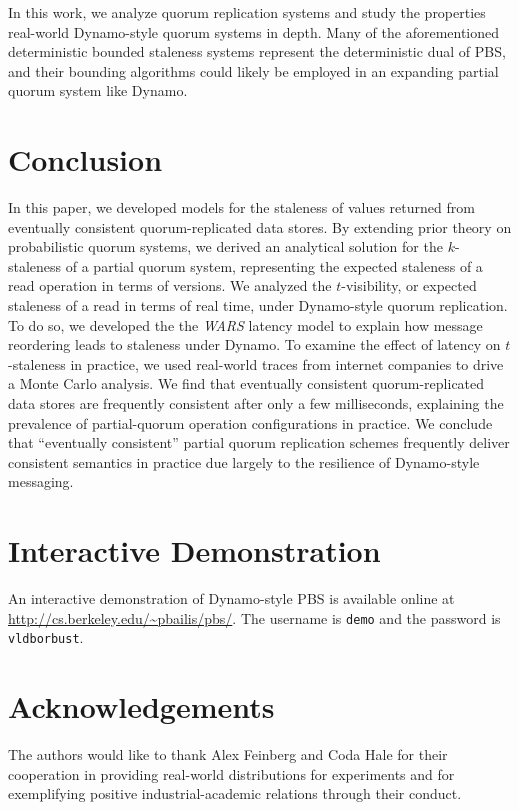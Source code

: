 \documentclass{vldb}
\begin{document}
In this work, we analyze quorum replication systems and study the
properties real-world Dynamo-style quorum systems in depth.  Many of
the aforementioned deterministic bounded staleness systems represent the
deterministic dual of PBS, and their bounding algorithms could likely
be employed in an expanding partial quorum system like Dynamo.

\section{Conclusion}
\label{sec:conclusion}

In this paper, we developed models for the staleness of values
returned from eventually consistent quorum-replicated data stores.  By
extending prior theory on probabilistic quorum systems, we derived an
analytical solution for the $k$-staleness of a partial quorum system,
representing the expected staleness of a read operation in terms of
versions.  We analyzed the $t$-visibility, or expected staleness of a
read in terms of real time, under Dynamo-style quorum replication.  To
do so, we developed the the \textit{WARS} latency model to explain how
message reordering leads to staleness under Dynamo.  To examine the
effect of latency on $t$-staleness in practice, we used real-world
traces from internet companies to drive a Monte Carlo analysis.  We
find that eventually consistent quorum-replicated data stores are
frequently consistent after only a few milliseconds, explaining the
prevalence of partial-quorum operation configurations in practice.  We
conclude that ``eventually consistent'' partial quorum replication
schemes frequently deliver consistent semantics in practice due largely to the
resilience of Dynamo-style messaging.

\section*{Interactive Demonstration}

An interactive demonstration of Dynamo-style PBS is available online at \url{http://cs.berkeley.edu/~pbailis/pbs/}.  The username is \texttt{demo} and the password is \texttt{vldborbust}.

\section*{Acknowledgements}

The authors would like to thank Alex Feinberg and Coda Hale for their
cooperation in providing real-world distributions for experiments and for
exemplifying positive industrial-academic relations through their conduct.
\end{document}
